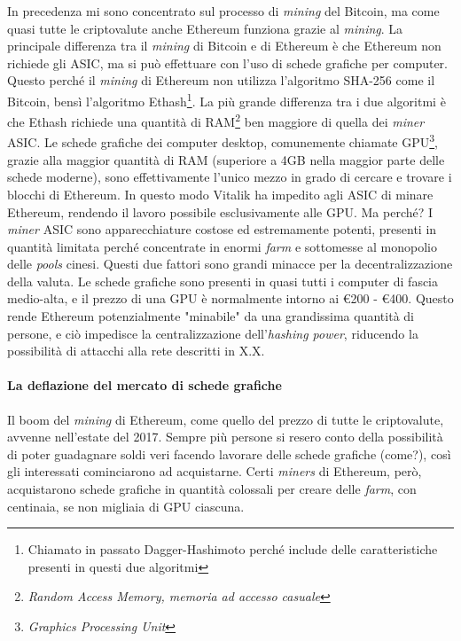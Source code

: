 \documentclass {article}
\begin{document}
In precedenza mi sono concentrato sul processo di \textit{mining} del Bitcoin, ma come quasi tutte le criptovalute anche Ethereum funziona grazie al \textit{mining}.
La principale differenza tra il \textit{mining} di Bitcoin e di Ethereum è che Ethereum non richiede gli ASIC, ma si può effettuare con l'uso di schede grafiche per computer.
Questo perché il \textit{mining} di Ethereum non utilizza l'algoritmo SHA-256 come il Bitcoin, bensì l'algoritmo Ethash\footnote{Chiamato in passato Dagger-Hashimoto perché include delle caratteristiche presenti in questi due algoritmi}.
La più grande differenza tra i due algoritmi è che Ethash richiede una quantità di RAM\footnote{\textit{Random Access Memory, memoria ad accesso casuale}} ben maggiore di quella dei \textit{miner} ASIC.
Le schede grafiche dei computer desktop, comunemente chiamate GPU\footnote{\textit{Graphics Processing Unit}}, grazie alla maggior quantità di RAM (superiore a 4GB nella maggior parte delle schede moderne), sono effettivamente l'unico mezzo in grado di cercare e trovare i blocchi di Ethereum.
In questo modo Vitalik ha impedito agli ASIC di minare Ethereum, rendendo il lavoro possibile esclusivamente alle GPU. Ma perché?
I \textit{miner} ASIC sono apparecchiature costose ed estremamente potenti, presenti in quantità limitata perché concentrate in enormi \textit{farm} e sottomesse al monopolio delle \textit{pools} cinesi.
Questi due fattori sono grandi minacce per la decentralizzazione della valuta.
Le schede grafiche sono presenti in quasi tutti i computer di fascia medio-alta, e il prezzo di una GPU è normalmente intorno ai \euro{200} - \euro{400}.
Questo rende Ethereum potenzialmente "minabile" da una grandissima quantità di persone, e ciò impedisce la centralizzazione dell'\textit{hashing power}, riducendo la possibilità di attacchi alla rete descritti in X.X.

\paragraph {La deflazione del mercato di schede grafiche}

Il boom del \textit{mining} di Ethereum, come quello del prezzo di tutte le criptovalute, avvenne nell'estate del 2017.
Sempre più persone si resero conto della possibilità di poter guadagnare soldi veri facendo lavorare delle schede grafiche (come?), così gli interessati cominciarono ad acquistarne.
Certi \textit{miners} di Ethereum, però, acquistarono schede grafiche in quantità colossali per creare delle \textit{farm}, con centinaia, se non migliaia di GPU ciascuna.
\end{document}
